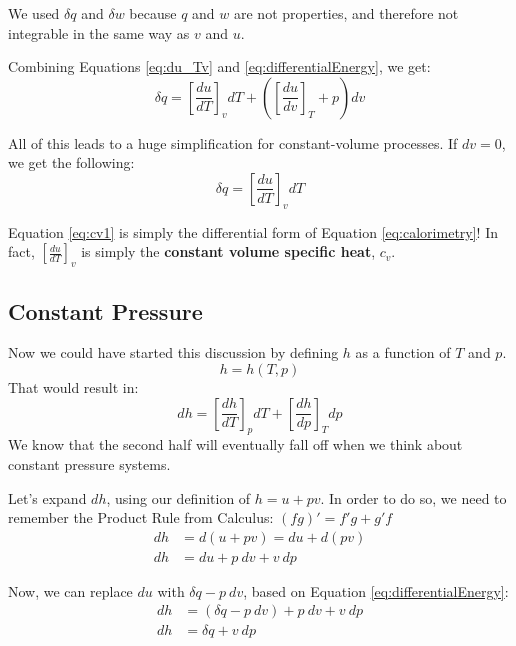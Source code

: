We used $\delta q$ and $\delta w$ because $q$ and $w$ are not properties, and therefore not integrable in the same way as $v$ and $u$.

Combining Equations \ref{eq:du_Tv} and \ref{eq:differentialEnergy}, we get:
\begin{equation*}
  \delta q = \left[\frac{d u}{d T}\right]_v dT + \left(\left[\frac{d u}{d v}\right]_T + p \right) dv
\end{equation*}

All of this leads to a huge simplification for constant-volume processes.  If $dv = 0$, we get the following:
\begin{equation} \label{eq:cv1}
  \delta q = \left[\frac{d u}{d T}\right]_v dT
\end{equation}

Equation \ref{eq:cv1} is simply the differential form of Equation \ref{eq:calorimetry}!  In fact, $\left[\frac{d u}{d T}\right]_v$ is simply the {\bf constant volume specific heat}, $c_v$.

\subsection{Constant Pressure}

Now we could have started this discussion by defining $h$ as a function of $T$ and $p$.
\begin{equation*}
  h = h(T, p)
\end{equation*}
That would result in:
\begin{equation}\label{eq:dh_Tp}
  dh = \left[\frac{d h}{d T}\right]_p dT + \left[\frac{d h}{d p}\right]_T dp
\end{equation}
We know that the second half will eventually fall off when we think about constant pressure systems.

Let's expand $dh$, using our definition of $h=u + pv$.  In order to do so, we need to remember the Product Rule from Calculus: $(fg)' = f'g + g'f$
\begin{align}
  \nonumber dh &= d(u + pv) = du + d(pv) \\
  \label{eq:dhExpanded} dh &= du + p\: dv + v\: dp
\end{align}

Now, we can replace $du$ with $\delta q - p\: dv$, based on Equation \ref{eq:differentialEnergy}:
\begin{align*}
  dh &= (\delta q - p\: dv) + p\: dv + v\: dp \\
  dh &= \delta q + v\: dp
\end{align*}

